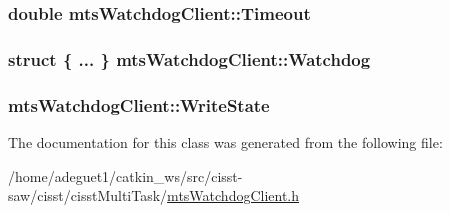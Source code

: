 \hypertarget{classmts_watchdog_client_a171e1861b979c9fa2078dba0550a11aa}{
\subsubsection[{Timeout}]{\setlength{\rightskip}{0pt plus 5cm}double mts\-Watchdog\-Client\-::\-Timeout\hspace{0.3cm}{\ttfamily [protected]}}}\label{classmts_watchdog_client_a171e1861b979c9fa2078dba0550a11aa}
\hypertarget{classmts_watchdog_client_af55c113ae1a80c6840a9617a8ef21f3b}{
\subsubsection[{Watchdog}]{\setlength{\rightskip}{0pt plus 5cm}struct \{ ... \}   mts\-Watchdog\-Client\-::\-Watchdog\hspace{0.3cm}{\ttfamily [protected]}}}\label{classmts_watchdog_client_af55c113ae1a80c6840a9617a8ef21f3b}
\hypertarget{classmts_watchdog_client_a2ea664a49adbdd5667624efef40044f8}{
\subsubsection[{Write\-State}]{ mts\-Watchdog\-Client\-::\-Write\-State}}\label{classmts_watchdog_client_a2ea664a49adbdd5667624efef40044f8}


The documentation for this class was generated from the following file\-:\begin{DoxyCompactItemize}
\item 
/home/adeguet1/catkin\-\_\-ws/src/cisst-\/saw/cisst/cisst\-Multi\-Task/\hyperlink{mts_watchdog_client_8h}{mts\-Watchdog\-Client.\-h}\end{DoxyCompactItemize}
